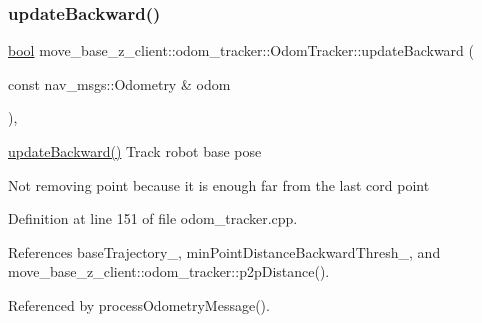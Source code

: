 \subsubsection{\texorpdfstring{update\+Backward()}{updateBackward()}}
{\footnotesize\ttfamily \hyperlink{classbool}{bool} move\+\_\+base\+\_\+z\+\_\+client\+::odom\+\_\+tracker\+::\+Odom\+Tracker\+::update\+Backward (\begin{DoxyParamCaption}\item[{const nav\+\_\+msgs\+::\+Odometry \&}]{odom }\end{DoxyParamCaption})\hspace{0.3cm}{\ttfamily [protected]}, {\ttfamily [virtual]}}

\hyperlink{classmove__base__z__client_1_1odom__tracker_1_1OdomTracker_ae613af99d85a8aa18c632e76efe41113}{update\+Backward()} Track robot base pose

Not removing point because it is enough far from the last cord point 

Definition at line 151 of file odom\+\_\+tracker.\+cpp.



References base\+Trajectory\+\_\+, min\+Point\+Distance\+Backward\+Thresh\+\_\+, and move\+\_\+base\+\_\+z\+\_\+client\+::odom\+\_\+tracker\+::p2p\+Distance().



Referenced by process\+Odometry\+Message().



